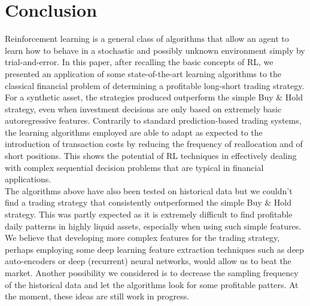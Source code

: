 \section{Conclusion}
\label{sec:conclusion}

Reinforcement learning is a general class of algorithms that allow an agent to learn how to behave in a stochastic and possibly unknown environment simply by trial-and-error. In this paper, after recalling the basic concepts of RL, we presented an application of some state-of-the-art learning algorithms to the classical financial problem of determining a profitable long-short trading strategy. For a synthetic asset, the strategies produced outperform the simple Buy \& Hold strategy, even when investment decisions are only based on extremely basic autoregressive features. Contrarily to standard prediction-based trading systems, the learning algorithms employed are able to adapt as expected to the introduction of transaction costs by reducing the frequency of reallocation and of short positions. This shows the potential of RL techniques in effectively dealing with complex sequential decision problems that are typical in financial applications.\\
The algorithms above have also been tested on historical data but we couldn't find a trading strategy that consistently outperformed the simple Buy \& Hold strategy. This was partly expected as it is extremely difficult to find profitable daily patterns in highly liquid assets, especially when using such simple features. We believe that developing more complex features for the trading strategy, perhaps employing some deep learning feature extraction techniques such as deep auto-encoders or deep (recurrent) neural networks, would allow us to beat the market. Another possibility we considered is to decrease the sampling frequency of the historical data and let the algorithms look for some profitable patters. At the moment, these ideas are still work in progress.  